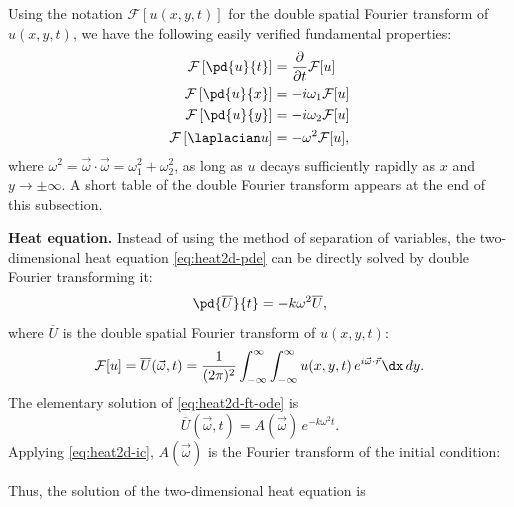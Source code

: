 Using the notation $\mathcal{F}[u(x,y,t)]$ for the double spatial Fourier transform of $u(x,y,t)$, we have the following easily verified fundamental properties:
\begin{align}
\label{eq:dft-time}
\mathcal{F}\left[\pd{u}{t}\right] &= \frac{\partial}{\partial t}\mathcal{F}[u] \\
\label{eq:dft-dx}
\mathcal{F}\left[\pd{u}{x}\right] &= -i\omega_1\mathcal{F}[u] \\
\label{eq:dft-dy}
\mathcal{F}\left[\pd{u}{y}\right] &= -i\omega_2\mathcal{F}[u] \\
\label{eq:dft-laplacian}
\mathcal{F}\left[\laplacian u\right] &= -\omega^2\mathcal{F}[u],
\end{align}
where $\omega^2 = \vec{\omega}\cdot\vec{\omega} = \omega_1^2+\omega_2^2$, as long as $u$ decays sufficiently rapidly as $x$ and $y \to \pm\infty$.  A short table of the double Fourier transform appears at the end of this subsection.

\textbf{Heat equation.}  Instead of using the method of separation of variables, the two-dimensional heat equation \eqref{eq:heat2d-pde} can be directly solved by double Fourier transforming it:
\begin{equation}
\label{eq:heat2d-ft-ode}
\pd{\overline{U}}{t} = -k\omega^2\overline{U},
\end{equation}
where $\overline{U}$ is the double spatial Fourier transform of $u(x,y,t)$:
\begin{equation}
\label{eq:heat2d-ft-def}
\mathcal{F}[u] = \overline{U}(\vec{\omega},t) = \frac{1}{(2\pi)^2}\int_{-\infty}^{\infty}\int_{-\infty}^{\infty}u(x,y,t)\,e^{i\vec{\omega}\cdot\vec{r}}\dx\,dy.
\end{equation}
The elementary solution of \eqref{eq:heat2d-ft-ode} is
\begin{equation}
\label{eq:heat2d-ft-sol}
\overline{U}(\vec{\omega},t) = A(\vec{\omega})\,e^{-k\omega^2 t}.
\end{equation}
Applying \eqref{eq:heat2d-ic}, $A(\vec{\omega})$ is the Fourier transform of the initial condition:

Thus, the solution of the two-dimensional heat equation is


